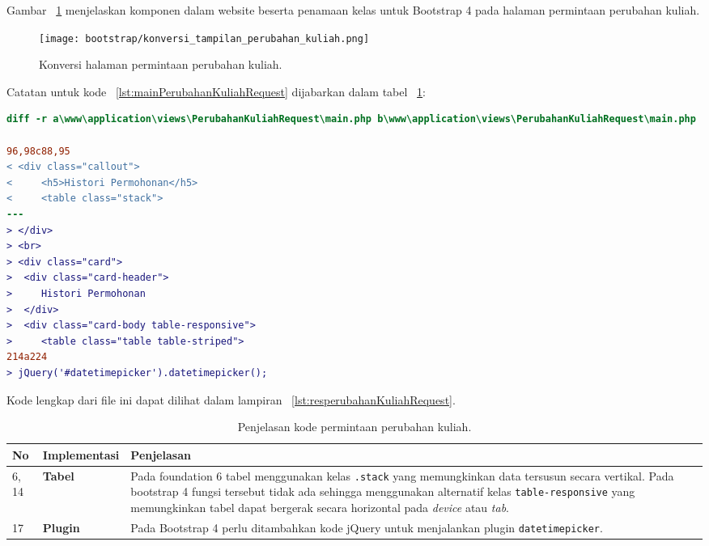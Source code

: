 \noindent Gambar ~\ref{fig:konversiPermintaanPerubahanKuliah} menjelaskan komponen dalam website beserta penamaan kelas untuk Bootstrap 4 pada halaman permintaan perubahan kuliah.\\
\begin{figure} [H]
	\centering  
	\texttt{[image: bootstrap/konversi\_tampilan\_perubahan\_kuliah.png]}
	\caption{Konversi halaman permintaan perubahan kuliah.}
	\label{fig:konversiPermintaanPerubahanKuliah}
\end{figure}
\noindent Catatan untuk kode ~\ref{lst:mainPerubahanKuliahRequest} dijabarkan dalam tabel ~\ref{tabel:permintaanPerubahanKuliah}:

\begin{lstlisting}[language=diff, caption=Perubahan file \path{\views\PerubahanKuliahRequest\main.php} ,  basicstyle=\ttfamily, frame=single,
columns=fullflexible, keepspaces=true, breaklines=true, label={lst:mainPerubahanKuliahRequest}]
diff -r a\www\application\views\PerubahanKuliahRequest\main.php b\www\application\views\PerubahanKuliahRequest\main.php

96,98c88,95
< <div class="callout">
<     <h5>Histori Permohonan</h5>
<     <table class="stack">
---
> </div>
> <br>
> <div class="card">
>  <div class="card-header">
>     Histori Permohonan
>  </div>
>  <div class="card-body table-responsive">
>     <table class="table table-striped">
214a224
> jQuery('#datetimepicker').datetimepicker();
\end{lstlisting}
Kode lengkap dari file ini dapat dilihat dalam lampiran ~\ref{lst:resperubahanKuliahRequest}.

\begin{table}[H]
	\centering
	\caption{Penjelasan kode permintaan perubahan kuliah.}
	\begin{tabularx}{\textwidth}{llX}
		\toprule
		No & Implementasi     & Penjelasan \\
		\midrule	
		6, 14 &\textbf{Tabel} & Pada foundation 6 tabel menggunakan kelas \texttt{.stack} yang memungkinkan data tersusun secara vertikal. Pada bootstrap 4 fungsi tersebut tidak ada sehingga menggunakan alternatif kelas \texttt{table-responsive} yang memungkinkan tabel dapat bergerak secara horizontal pada \textit{device} atau \textit{tab}. \\
		17 &\textbf{Plugin} & Pada Bootstrap 4 perlu ditambahkan kode jQuery untuk menjalankan plugin \texttt{datetimepicker}. \\
		\bottomrule
	\end{tabularx}%
	\label{tabel:permintaanPerubahanKuliah}
\end{table}

